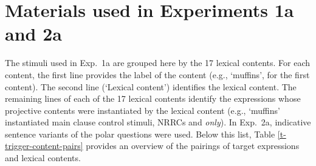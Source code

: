 \documentclass[11pt,fleqn]{article}
\newcommand{\6}{\mbox{$[\hspace*{-.6mm}[$}}
\newcommand{\9}{\mbox{$]\hspace*{-.6mm}]$}}
\begin{document}
%
%
%
%
%
%
%
%
%
%
%
%
%
%
%
%
%
%
%

\section{Materials used in Experiments 1a and 2a}\label{a-exp1a-2a-stimuli}



The stimuli used in Exp.~1a are grouped here by the 17 lexical contents. For each content, the first line provides the label of the content (e.g., `muffins', for the first content). The second line (`Lexical content') identifies the lexical content. The remaining lines of each of the 17 lexical contents identify the expressions whose projective contents were instantiated by the lexical content (e.g., `muffins' instantiated main clause control stimuli, NRRCs and {\em only}). In Exp.~2a, indicative sentence variants of the polar questions were used. Below this list, Table \ref{t-trigger-content-pairs} provides an overview of the pairings of target expressions and lexical contents.
\end{document}
